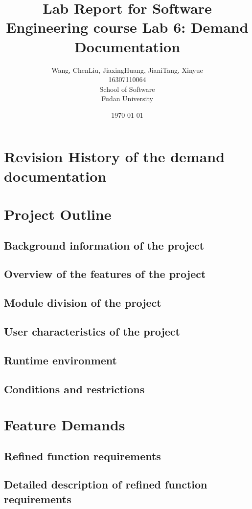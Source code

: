 \documentclass[a4paper]{report}
\title{Lab Report for Software Engineering course \newline
 Lab 6: Demand Documentation}
\author{Wang, Chen\qquad Liu, Jiaxing\qquad Huang, Jiani\qquad Tang, Xinyue \\
16307110064\qquad17302010049\qquad 17302010063\qquad 16307110476 \\
School of Software\\
Fudan University
}
\date{\today}
\begin{document}
\maketitle

\tableofcontents
\chapter{Revision History of the demand documentation}

\chapter{Project Outline}
\section{Background information of the project}

\section{Overview of the features of the project}

\section{Module division of the project}

\section{User characteristics of the project}

\section{Runtime environment}

\section{Conditions and restrictions}

\chapter{Feature Demands}

\section{Refined function requirements}

\section{Detailed description of refined function requirements}
\end{document}
